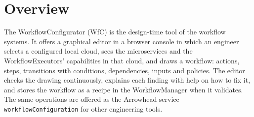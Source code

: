 \documentclass[a4paper]{arrowhead}
\begin{document}

\ArrowheadSetup

\begin{center}
  \vspace*{1cm}
  \huge{\arrowtitle}

  \vspace*{0.2cm}
  \LARGE{\arrowtype}
  \vspace*{1cm}

  
  \vspace*{\fill}

  

  \vspace*{1cm}
  \vspace*{\fill}

  \begin{abstract}
    This document describes the WorkflowConfigurator, an Eclipse Arrowhead support system that lets an engineer draw workflows with conditions between the microservices of configured local clouds, and validates and stores them in the WorkflowManager. Documentation edition 5.4.0; system version 5.4.0 (framework), service versions 1.0.0.
  \end{abstract}

  \vspace*{1cm}
\end{center}

\newpage

\tableofcontents
\newpage

\section{Overview}
\label{sec:overview}
The WorkflowConfigurator (WfC) is the design-time tool of the workflow systems. It offers a graphical
editor in a browser console in which an engineer selects a configured local cloud, sees the microservices and the
WorkflowExecutors' capabilities in that cloud, and draws a workflow: actions, steps, transitions with conditions,
dependencies, inputs and policies. The editor checks the drawing continuously, explains each finding with help on how
to fix it, and stores the workflow as a recipe in the WorkflowManager when it validates. The same operations are
offered as the Arrowhead service \texttt{workflowConfiguration} for other engineering tools.
\end{document}
